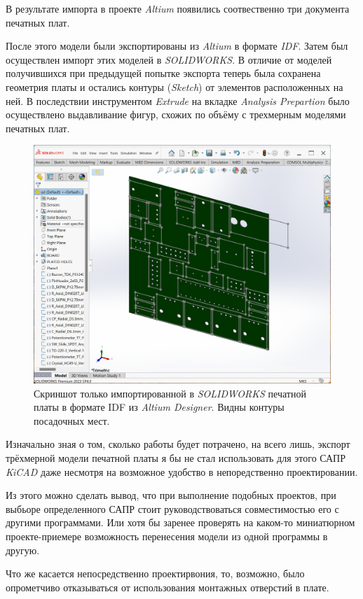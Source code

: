 В результате импорта в проекте \textit{Altium} появились соотвественно три документа печатных плат.

После этого модели были экспортированы из \textit{Altium} в формате \textit{IDF}. Затем был осуществлен импорт этих моделей в \textit{SOLIDWORKS}. В отличие от моделей получившихся при предыдущей попытке экспорта теперь была сохранена геометрия платы и остались контуры (\textit{Sketch}) от элементов расположенных на ней. В последствии инструментом \textit{Extrude} на вкладке \textit{Analysis Prepartion} было осуществлено выдавливание фигур, схожих по объёму с трехмерным моделями печатных плат.

\begin{figure}[H]
  \centering
  \includegraphics[scale=0.3]{../img/scrot/Screenshot-2024-05-08-132748.png}
  \caption{Скриншот только импортированной в \textit{SOLIDWORKS} печатной платы в формате IDF из \textit{Altium Designer}. Видны контуры посадочных мест.}

\end{figure}


Изначально зная о том, сколько работы будет потрачено, на всего лишь, экспорт трёхмерной модели печатной платы я бы не стал использовать для этого САПР \textit{KiCAD} даже несмотря на возможное удобство в непоредственно проектировании.

Из этого можно сделать вывод, что при выполнение подобных проектов, при выбьоре определенного САПР стоит руководствоваться совместимостью его с другими программами.
Или хотя бы заренее проверять на каком-то миниатюрном проекте-приемере возможность перенесения модели из одной программы в другую.

Что же касается непосредственно проектирвония, то, возможно, было опрометчиво отказываться от использования монтажных отверстий в плате.
